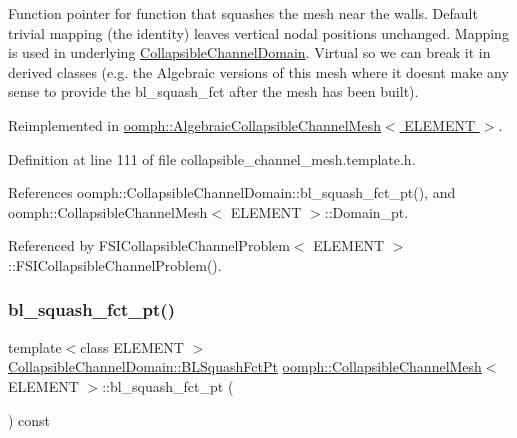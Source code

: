 Function pointer for function that squashes the mesh near the walls. Default trivial mapping (the identity) leaves vertical nodal positions unchanged. Mapping is used in underlying \hyperlink{classoomph_1_1CollapsibleChannelDomain}{Collapsible\+Channel\+Domain}. Virtual so we can break it in derived classes (e.\+g. the Algebraic versions of this mesh where it doesn\textquotesingle{}t make any sense to provide the bl\+\_\+squash\+\_\+fct after the mesh has been built). 



Reimplemented in \hyperlink{classoomph_1_1AlgebraicCollapsibleChannelMesh_abf1848b49f57419af4379a637464587d}{oomph\+::\+Algebraic\+Collapsible\+Channel\+Mesh$<$ E\+L\+E\+M\+E\+N\+T $>$}.



Definition at line 111 of file collapsible\+\_\+channel\+\_\+mesh.\+template.\+h.



References oomph\+::\+Collapsible\+Channel\+Domain\+::bl\+\_\+squash\+\_\+fct\+\_\+pt(), and oomph\+::\+Collapsible\+Channel\+Mesh$<$ E\+L\+E\+M\+E\+N\+T $>$\+::\+Domain\+\_\+pt.



Referenced by F\+S\+I\+Collapsible\+Channel\+Problem$<$ E\+L\+E\+M\+E\+N\+T $>$\+::\+F\+S\+I\+Collapsible\+Channel\+Problem().

\mbox{\label{classoomph_1_1CollapsibleChannelMesh_a5c073c93cce7e6b6e9de86f36cb1e965}} 
\subsubsection{\texorpdfstring{bl\+\_\+squash\+\_\+fct\+\_\+pt()}{bl\_squash\_fct\_pt()}\hspace{0.1cm}{\footnotesize\ttfamily [2/2]}}
{\footnotesize\ttfamily template$<$class E\+L\+E\+M\+E\+NT $>$ \\
\hyperlink{classoomph_1_1CollapsibleChannelDomain_a2bf1d7943bfac134a5c27a54c7e1faed}{Collapsible\+Channel\+Domain\+::\+B\+L\+Squash\+Fct\+Pt} \hyperlink{classoomph_1_1CollapsibleChannelMesh}{oomph\+::\+Collapsible\+Channel\+Mesh}$<$ E\+L\+E\+M\+E\+NT $>$\+::bl\+\_\+squash\+\_\+fct\+\_\+pt (\begin{DoxyParamCaption}{ }\end{DoxyParamCaption}) const\hspace{0.3cm}{\ttfamily [inline]}}



